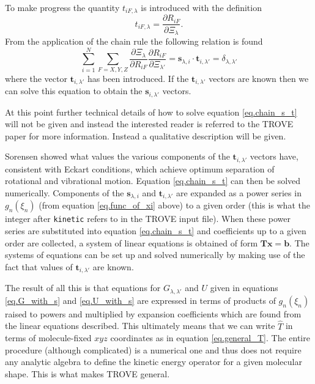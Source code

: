 To make progress the quantity $t_{iF,\lambda}$ is introduced with the definition
\begin{equation}
\label{eq.def_t}
t_{iF,\lambda} = \frac{\partial R_{iF}}{\partial \Xi_{\lambda}}.
\end{equation}
From the application of the chain rule the following relation is found
\begin{equation}
\label{eq.chain_s_t}
\sum_{i=1}^{N} \sum_{F=X,Y,Z} \frac{\partial \Xi_{\lambda} }{\partial R_{iF} } \frac{\partial R_{iF}}{\partial \Xi_{\lambda'}}
= \mathbf{s}_{\lambda,i} \cdot \mathbf{t}_{i,\lambda'} = \delta_{\lambda,\lambda'}
\end{equation}
where the vector $\mathbf{t}_{i,\lambda'}$ has been introduced. If the $\mathbf{t}_{i,\lambda'}$ vectors are known then
we can solve this equation to obtain the $\mathbf{s}_{i,\lambda'}$ vectors.

At this point further technical details of how to solve equation \ref{eq.chain_s_t} will not be given and instead the 
interested reader is referred to the TROVE paper \cite{TROVE} for more information. Instead a qualitative description
will be given. 

Sorensen \cite{79Soxxxx.method} showed what values the various components of the $\mathbf{t}_{i,\lambda'}$ vectors have,
consistent with Eckart conditions, which achieve optimum separation of rotational and vibrational motion. Equation
\ref{eq.chain_s_t} can then be solved numerically. Components of the $\mathbf{s}_{\lambda,i}$ and $\mathbf{t}_{i,\lambda'}$
are expanded as a power series in $g_n({\xi_n})$ (from equation \ref{eq.func_of_xi} above) to a given order
(this is what the integer after \verb|kinetic| refers to in the TROVE input file). When these 
power series are substituted into equation \ref{eq.chain_s_t} and coefficients up to a given order are collected, a
system of linear equations is obtained of form $\mathbf{T}\mathbf{x} = \mathbf{b}$. The systems of equations can be 
set up and solved numerically by making use of the fact that values of $\mathbf{t}_{i,\lambda'}$ are known.

The result of all this is that equations for $G_{\lambda,\lambda'}$ and $U$ given in equations \ref{eq.G_with_s} and
\ref{eq.U_with_s} are expressed in terms of products of $g_n(\xi_n)$ raised to powers and multiplied by expansion 
coefficients which are found from the linear equations described. This ultimately means that we can write $\hat{T}$ 
in terms of molecule-fixed $xyz$ coordinates as in equation \ref{eq.general_T}. The entire procedure
(although complicated) is a numerical one
and thus does not require any analytic algebra to define the kinetic energy operator for a given molecular shape. This is
what makes TROVE general. 


